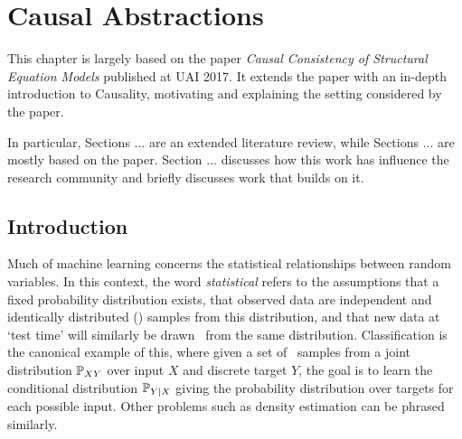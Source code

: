 \chapter{Causal Abstractions}

\ifpdf
    \graphicspath{{Chapter3/Figs/Raster/}{Chapter3/Figs/PDF/}{Chapter3/Figs/}}
\else
    \graphicspath{{Chapter3/Figs/Vector/}{Chapter3/Figs/}}
\fi

This chapter is largely based on the paper \emph{Causal Consistency of Structural Equation Models} published at UAI 2017. It extends the paper with an in-depth introduction to Causality, motivating and explaining the setting considered by the paper.

In particular, Sections ... are an extended literature review, while Sections ... are mostly based on the paper. Section ... discusses how this work has influence the research community and briefly discusses work that builds on it.



\section{Introduction}

Much of machine learning concerns the statistical relationships between random variables. In this context, the word \emph{statistical} refers to the assumptions that a fixed probability distribution exists, that observed data are independent and identically distributed (\iid) samples from this distribution, and that new data at `test time' will similarly be drawn \iid~from the same distribution.
Classification is the canonical example of this, where given a set of \iid~samples from a joint distribution $\mathbb{P}_{XY}$ over input $X$ and discrete target $Y$, the goal is to learn the conditional distribution $\mathbb{P}_{Y|X}$ giving the probability distribution over targets for each possible input. Other problems such as density estimation can be phrased similarly.

